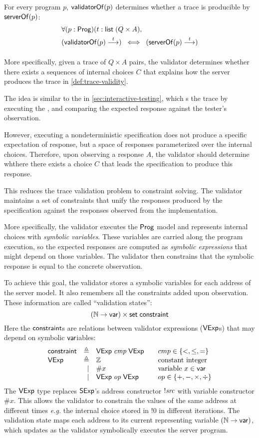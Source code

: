 For every program $p$, $\mathsf{validatorOf}(p)$ determines whether a trace is
producible by $\mathsf{serverOf}(p)$:
\begin{align*}
  &\forall (p:\Prog)(t:\List(Q\times A),\\
  &(\behaves{\validatorOf(p)}t)\;\iff\;(\behaves{\serverOf(p)}t)
\end{align*}

More specifically, given a trace of $Q\times A$ pairs, the validator determines
whether there exists a sequences of internal choices $C$ that explains how the
server produces the trace in \autoref{def:trace-validity}.

The idea is similar to the  in \autoref{sec:interactive-testing},
which s the trace by executing the , and comparing
the expected response against the tester's observation.

However, executing a nondeterministic specification does not produce a specific
expectation of response, but a space of responses parameterized over the
internal choices.  Therefore, upon observing a response $A$, the validator
should determine whthere there exists a choice $C$ that leads the specification
to produce this response.

This reduces the trace validation problem to constraint solving.  The validator
maintains a set of constraints that unify the responses produced by the
specification against the responses observed from the implementation.

More specifically, the validator executes the $\mathsf{Prog}$ model and represents
internal choices with {\em symbolic variables}.  These variables are carried
along the program execution, so the expected responses are computed as {\em
  symbolic expressions} that might depend on those variables.  The validator
then constrains that the symbolic response is equal to the concrete observation.

To achieve this goal, the validator stores a symbolic variables for each address
of the server model.  It also remembers all the constraints added upon
observation.  These information are called ``validation states'':
\[(\mathbb N\to\mathsf{var})\times\mathsf{set}\;\mathsf{constraint}\]
Here the $\mathsf{constraint}$s are relations between validator expressions ($\mathsf{VExp}$s)
that may depend on symbolic $\mathsf{var}$iables:
\[\begin{array}{lrl@{\qquad}l}
\constraint&\triangleq&\Vexp\ccmp\Vexp&cmp\in\{<,\le,=\}\\
\Vexp&\triangleq&\Int&\text{constant integer}\\
&\mid&\#x&\text{variable }x\in\Var\\
&\mid&\Vexp\oop\Vexp&op\in\{+,-,\times,\div\}\\
\end{array}\]
The $\mathsf{VExp}$ type replaces $\mathsf{SExp}$'s address constructor $!\mathit{src}$ with variable
constructor $\#x$.  This allows the validator to constrain the values of the
same address at different times {\it e.g.} the internal choice stored in $!0$ in
different iterations.  The validation state maps each address to its current
representing variable $(\mathbb N\to\mathsf{var})$, which updates as the validator
symbolically executes the server program.

